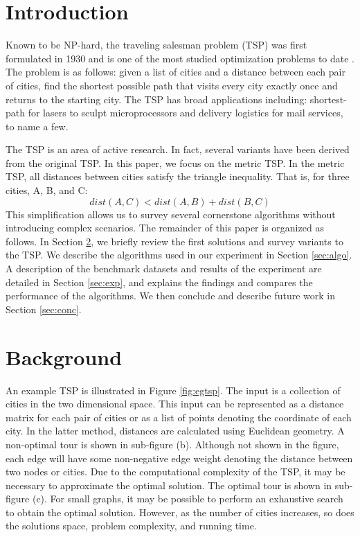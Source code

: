\documentclass[10pt,twocolumn,letterpaper]{article}
\begin{document}
\section{Introduction}
Known to be NP-hard, the traveling salesman problem (TSP) was first formulated in 1930 and is one of the most studied optimization problems to date \cite{hoffman1986traveling}. The problem is as follows: given a list of cities and a distance between each pair of cities, find the shortest possible path that visits every city exactly once and returns to the starting city. The TSP has broad applications including: shortest-path
for lasers to sculpt microprocessors and delivery logistics for mail services, to name a few.

The TSP is an area of active research. In fact, several
variants have been derived from the original TSP. In this
paper, we focus on the metric TSP. In the metric TSP, all
distances between cities satisfy the triangle inequality. That is, for three cities, A, B, and C:
\begin{equation}
	dist(A, C) < dist(A, B) + dist(B, C)
\end{equation}
This simplification allows us to survey several cornerstone algorithms without introducing complex scenarios. The remainder of this paper is organized
as follows. In Section \ref{sec:background}, we briefly review the first solutions and survey variants to the TSP. We
describe the algorithms used in our experiment in Section \ref{sec:algo}. A description of
the benchmark datasets and results of the experiment are
detailed in Section \ref{sec:exp}, and explains the
findings and compares the performance of the algorithms.
We then conclude and describe future work in Section \ref{sec:conc}.

\section{Background}\label{sec:background}
An example TSP is illustrated in Figure \ref{fig:egtsp}. The input is a collection of cities in the two dimensional space. This input can be represented as a distance matrix for each pair of cities or as a list of points
denoting the coordinate of each city. In the latter method,
distances are calculated using Euclidean geometry. A non-optimal tour is shown in sub-figure (b). Although not shown in the figure, each edge will have some non-negative edge
weight denoting the distance between two nodes or cities.
Due to the computational complexity of the TSP, it may be
necessary to approximate the optimal solution. The optimal
tour is shown in sub-figure (c). For small graphs, it may be
possible to perform an exhaustive search to obtain the optimal solution. However, as the number of cities increases, so
does the solutions space, problem complexity, and running
time.
\end{document}
